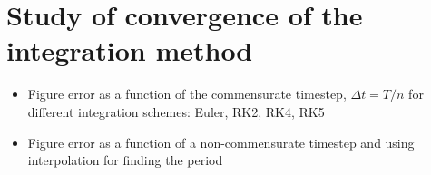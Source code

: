     \tableofcontents%

    \listoffigures %
    \listoftables \clearpage



    \setlength{\parskip}{1em plus 0.5em minus 0.2em}

    \pagestyle{fancy}
    \fancyhf{}

    \makeatletter
        \fancyhead[L]{\@title}
        \fancyfoot[C]{\@author}
        \fancyfoot[R]{\thepage}
    \makeatother

    \renewcommand{\headrulewidth}{1pt}
    \renewcommand{\footrulewidth}{0.75pt}

    
    
    
    
    \section{Study of convergence of the integration method}
    \begin{itemize}
        \item Figure error as a function of the commensurate timestep, $\Delta t = T/n$ for different integration schemes: Euler, RK2, RK4, RK5 
        \item Figure error as a function of a non-commensurate timestep and using interpolation for finding the period
    \end{itemize}
    

    


    \printbibliography[heading=bibintoc]





